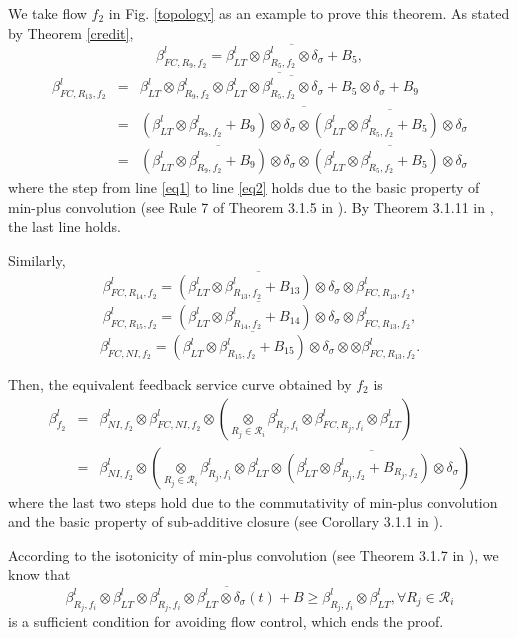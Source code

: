 \documentclass[preprint]{elsarticle}
\begin{document}
\begin{pf}
We take flow $f_2$ in Fig. \ref{topology} as an example to prove this theorem. As stated by Theorem \ref{credit}, $$\beta_{FC,R_9,f_2}^l=\overline{\beta^l_{LT}\otimes\beta_{R_5,f_2}^l\otimes\delta_\sigma+B_5},$$
\begin{eqnarray}
\beta_{FC,R_{13},f_2}^l&=&\overline{\beta^l_{LT}\otimes\beta^l_{R_9,f_2}\otimes\overline{\beta^l_{LT}\otimes\beta^l_{R_5,f_2}\otimes\delta_\sigma+B_5}\otimes\delta_\sigma+B_9}\label{eq1}\\
&=&\overline{(\beta^l_{LT}\otimes\beta^l_{R_9,f_2}+B_9)\otimes\delta_\sigma\otimes\overline{(\beta^l_{LT}\otimes\beta^l_{R_5,f_2}+B_5)\otimes\delta_\sigma}}\label{eq2}\\
&=&\overline{(\beta^l_{LT}\otimes\beta^l_{R_9,f_2}+B_9)\otimes\delta_\sigma}\otimes\overline{(\beta^l_{LT}\otimes\beta^l_{R_5,f_2}+B_5)\otimes\delta_\sigma}\label{eq3}
\end{eqnarray}
where the step from line \ref{eq1} to line \ref{eq2} holds due to the basic property of min-plus convolution (see Rule 7 of Theorem 3.1.5 in \cite{Boudec2001Network}). By Theorem 3.1.11 in \cite{Boudec2001Network}, the last line holds.

Similarly, $$\beta_{FC,R_{14},f_2}^l=\overline{(\beta^l_{LT}\otimes\beta^l_{R_{13},f_2}+B_{13})\otimes\delta_\sigma}\otimes\beta_{FC,R_{13},f_2}^l,$$
$$\beta_{FC,R_{15},f_2}^l=\overline{(\beta^l_{LT}\otimes\beta^l_{R_{14},f_2}+B_{14})\otimes\delta_\sigma}\otimes\beta_{FC,R_{13},f_2}^l,$$
$$\beta_{FC,NI,f_2}^l=\overline{(\beta^l_{LT}\otimes\beta^l_{R_{15},f_2}+B_{15})\otimes\delta_\sigma}\otimes\otimes\beta_{FC,R_{13},f_2}^l.$$

Then, the equivalent feedback service curve obtained by $f_2$ is
\begin{eqnarray}
\beta_{f_2}^l&=&\beta_{NI,f_2}^l\otimes\beta_{FC,NI,f_2}^l\otimes(\underset{R_j\in\mathcal{R}_i}{\otimes}\beta^l_{R_j,f_i}\otimes\beta^l_{FC,R_j,f_i}\otimes\beta_{LT}^l)\\
&=& \beta_{NI,f_2}^l\otimes(\underset{R_j\in\mathcal{R}_i}{\otimes}\beta^l_{R_j,f_i}\otimes\beta_{LT}^l\otimes\overline{(\beta^l_{LT}\otimes\beta^l_{R_{j},f_2}+B_{R_j,f_2})\otimes\delta_\sigma})
\end{eqnarray}
where the last two steps hold due to the commutativity of min-plus convolution and the basic property of sub-additive closure (see Corollary 3.1.1 in \cite{Boudec2001Network}).

According to the isotonicity of min-plus convolution (see Theorem 3.1.7 in \cite{Boudec2001Network}), we know that $$\beta_{R_j,f_i}^l\otimes\beta_{LT}^l\otimes\overline{\beta_{R_j,f_i}^l\otimes\beta_{LT}^l\otimes\delta_\sigma(t)+B}\geq\beta_{R_j,f_i}^l\otimes\beta_{LT}^l,\forall R_j\in\mathcal{R}_i$$ is a sufficient condition for avoiding flow control, which ends the proof.
\end{pf}
\end{document}
